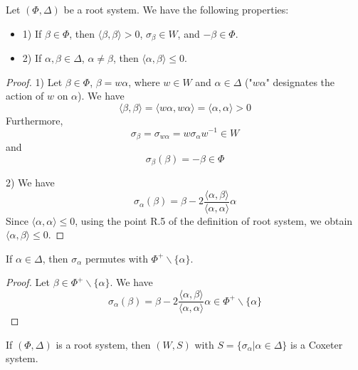 \begin{proposition}
Let $(\Phi, \Delta )$ be a root system. We have the following properties:
\begin{itemize}
\item 1) If $\beta \in \Phi$, then $\langle \beta, \beta \rangle > 0$, $\sigma_\beta \in W$, and $-\beta \in \Phi$.
\item 2) If $\alpha, \beta \in \Delta$, $\alpha \neq \beta$, then $\langle \alpha, \beta \rangle \le 0$.
\end{itemize}
\end{proposition}
\begin{proof}
1) Let $\beta \in \Phi$, $\beta = w \alpha $, where $w \in W$ and $\alpha \in \Delta$ ("$w \alpha$" designates the action of $w$ on $\alpha$). We have
\begin{equation}
\langle \beta, \beta \rangle = \langle w \alpha, w \alpha \rangle = \langle \alpha , \alpha \rangle > 0
\end{equation} Furthermore,
\begin{equation}
\sigma_\beta = \sigma_{w \alpha} = w \sigma_\alpha w^{-1} \in W
\end{equation} and
\begin{equation}
\sigma_\beta(\beta) = - \beta \in \Phi
\end{equation}

2) We have
\begin{equation}
\sigma_\alpha (\beta ) = \beta - 2 \frac{\langle \alpha, \beta \rangle}{\langle \alpha , \alpha \rangle} \alpha
\end{equation} Since $\langle \alpha , \alpha \rangle \le 0$, using the point R.5 of the definition of root system, we obtain $\langle \alpha, \beta \rangle \le 0$.


\end{proof}

\begin{lemma}
If $\alpha \in \Delta$, then $\sigma_\alpha$ permutes with $\Phi^+ \backslash \{ \alpha \}$.
\end{lemma}
\begin{proof}
Let $\beta \in \Phi^+ \backslash \{ \alpha \}$. We have
\begin{equation}
\sigma_\alpha (\beta ) = \beta - 2 \frac{\langle \alpha , \beta \rangle }{\langle \alpha, \alpha \rangle} \alpha \in \Phi^+ \backslash \{ \alpha \}
\end{equation}
\end{proof}

\begin{theorem}
If $(\Phi, \Delta)$ is a root system, then $(W, S)$ with $S = \{\sigma_\alpha | \alpha \in \Delta \}$ is a Coxeter system.
\end{theorem}

